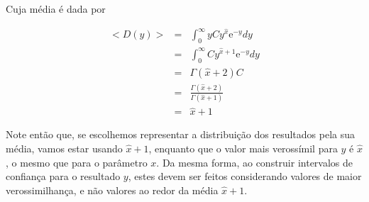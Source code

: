 Cuja m\'edia \'e dada por

\begin{eqnarray*}
	<D(y)> & = & \int_0^\infty y C y^{\hat x} \mathrm{e}^{-y} dy \\
	       & = & \int_0^\infty C y^{\hat x+1} \mathrm{e}^{-y} dy \\
		   & = & \Gamma(\hat x +2) C\\
	       & = & \frac{\Gamma(\hat x +2)}{\Gamma(\hat x + 1)} \\
		   & = & \hat x + 1
\end{eqnarray*}

Note ent\~ao que, se escolhemos representar a distribui\c c\~ao dos resultados pela sua m\'edia,
vamos estar usando $\hat x + 1$, enquanto que o valor mais verossímil para $y$ \'e $\hat x$, o mesmo
que para o par\^ametro $x$. Da mesma forma, ao construir intervalos de confian\c ca para o resultado
$y$, estes devem ser feitos considerando valores de maior verossimilhança, e n\~ao valores ao redor 
da m\'edia $\hat x + 1$. 
